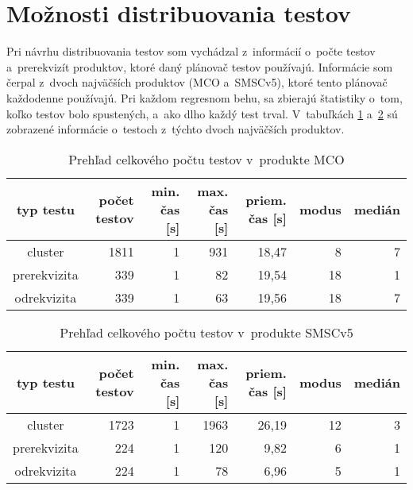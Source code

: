 \section{Možnosti distribuovania testov}
\label{sekcia:moznosti_distribuovania}
Pri návrhu distribuovania testov som vychádzal z~informácií o~počte testov a~prerekvizít produktov,
ktoré daný plánovač testov používajú. Informácie som čerpal z~dvoch najväčších produktov (MCO a~SMSCv5), 
ktoré tento plánovač každodenne používajú. Pri každom regresnom behu, sa zbierajú štatistiky o~tom,
koľko testov bolo spustených, a~ako dlho každý test trval. 
V~tabuľkách \ref{tabulka:testy_mco} a~\ref{tabulka:testy_smsc} sú zobrazené informácie o~testoch z~týchto dvoch najväčších produktov.

\begin{table}
  \begin{center}
    \begin{tabular}{| c | r | r | r | r | r | r |}
    \hline
    typ testu & počet testov & min. čas [s] & max. čas [s] & priem. čas [s] & modus & medián \\ \hline
    cluster      & 1811 & 1 & 931 & 18,47 & 8  & 7 \\ \hline
    prerekvizita & 339  & 1 & 82  & 19,54 & 18 & 1 \\ \hline
    odrekvizita  & 339  & 1 & 63  & 19,56 & 18 & 7 \\
    \hline
    \end{tabular}
    \caption{Prehľad celkového počtu testov v~produkte MCO}
    \label{tabulka:testy_mco}
  \end{center}
\end{table}

\begin{table}
  \begin{center}
    \begin{tabular}{| c | r | r | r | r | r | r |}
    \hline
    typ testu & počet testov & min. čas [s] & max. čas [s] & priem. čas [s] & modus & medián \\ \hline
    cluster      & 1723 & 1 & 1963 & 26,19 & 12 & 3 \\ \hline
    prerekvizita & 224  & 1 & 120  & 9,82  & 6  & 1 \\ \hline
    odrekvizita  & 224  & 1 & 78   & 6,96  & 5  & 1 \\
    \hline
    \end{tabular}
    \caption{Prehľad celkového počtu testov v~produkte SMSCv5}
    \label{tabulka:testy_smsc}
  \end{center}
\end{table}

